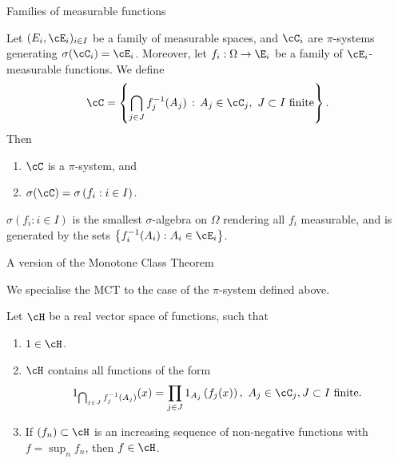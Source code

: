 \begin{frame}
    {Families of measurable functions}
        
    Let $(E_i, \cE_i)_{i\in I}$ be a family of measurable spaces, and $\cC_i$
    are $\pi$-systems generating $\sigma(\cC_i)=\cE_i$. Moreover, let $f_i :
    \Omega \to \E_i$ be a family of $\cE_i$-measurable functions.  We define
    \begin{equation*}
        \cC = \left\{  \bigcap_{j\in J} f_j^{-1}(A_j) \,:\,  A_j \in \cC_j, \ J \subset I \text{ finite} \right\}.
    \end{equation*}
    Then
    \begin{enumerate}
        \item $\cC$ is a $\pi$-system, and
        \item $\sigma(\cC) = \sigma\left( f_i : i\in I \right)$.
    \end{enumerate}

$\sigma\left( f_i : i\in I \right)$ is the smallest $\sigma$-algebra on
$\Omega$ rendering all $f_i$ measurable, and is generated by the sets $\left\{
f_i^{-1}(A_i) : A_i \in \cE_i \right\}$.
\end{frame}


\begin{frame}
    {A version of the Monotone Class Theorem}

    We specialise the MCT to the case of the $\pi$-system defined above.
    \begin{theorem}
        Let $\cH$ be a real vector space of functions, such that
        \begin{enumerate}
            \item $1\in\cH$. 
            \item $\cH$ contains all functions of the form
                \begin{equation*}
                    1_{\bigcap_{j\in J} f_j^{-1}(A_j)} (x) = 
                    \prod_{j\in J} 1_{A_j} \left( f_{j}(x) \right), \ A_j \in \cC_j, J \subset I \text{ finite}.
                \end{equation*}
            \item If $\left( f_n \right) \subset \cH$ is an increasing sequence of non-negative
                functions with $f = \sup_{n} f_n$, then $f\in\cH$.
        \end{enumerate}
    \end{theorem}

\end{frame}


